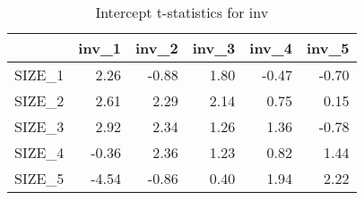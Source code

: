 \begin{table}[ht]
\centering
\caption{Intercept t-statistics for inv} 
\begin{tabular}{rrrrrr}
  \hline
 & inv\_1 & inv\_2 & inv\_3 & inv\_4 & inv\_5 \\ 
  \hline
SIZE\_1 & 2.26 & -0.88 & 1.80 & -0.47 & -0.70 \\ 
  SIZE\_2 & 2.61 & 2.29 & 2.14 & 0.75 & 0.15 \\ 
  SIZE\_3 & 2.92 & 2.34 & 1.26 & 1.36 & -0.78 \\ 
  SIZE\_4 & -0.36 & 2.36 & 1.23 & 0.82 & 1.44 \\ 
  SIZE\_5 & -4.54 & -0.86 & 0.40 & 1.94 & 2.22 \\ 
   \hline
\end{tabular}
\end{table}


